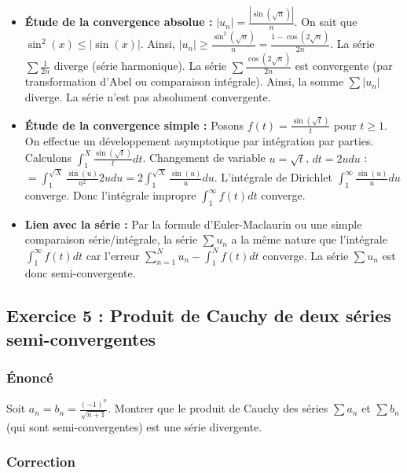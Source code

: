\documentclass[12pt,a4paper]{report}
\begin{document}
\begin{itemize}
\item \textbf{Étude de la convergence absolue :} $|u_n| = \frac{|\sin(\sqrt{n})|}{n}$. On sait que $\sin^2(x) \le |\sin(x)|$. Ainsi, $|u_n| \ge \frac{\sin^2(\sqrt{n})}{n} = \frac{1 - \cos(2\sqrt{n})}{2n}$.
La série $\sum \frac{1}{2n}$ diverge (série harmonique). La série $\sum \frac{\cos(2\sqrt{n})}{2n}$ est convergente (par transformation d'Abel ou comparaison intégrale). Ainsi, la somme $\sum |u_n|$ diverge. La série n'est pas absolument convergente.
\item \textbf{Étude de la convergence simple :} Posons $f(t) = \frac{\sin(\sqrt{t})}{t}$ pour $t \ge 1$.
On effectue un développement asymptotique par intégration par parties. Calculons $\int_1^X \frac{\sin(\sqrt{t})}{t} dt$. Changement de variable $u = \sqrt{t}$, $dt = 2u du$ :
$= \int_1^{\sqrt{X}} \frac{\sin(u)}{u^2} 2u du = 2 \int_1^{\sqrt{X}} \frac{\sin(u)}{u} du$.
L'intégrale de Dirichlet $\int_1^\infty \frac{\sin(u)}{u} du$ converge. Donc l'intégrale impropre $\int_1^\infty f(t) dt$ converge.
\item \textbf{Lien avec la série :} Par la formule d'Euler-Maclaurin ou une simple comparaison série/intégrale, la série $\sum u_n$ a la même nature que l'intégrale $\int_1^\infty f(t) dt$ car l'erreur $\sum_{n=1}^N u_n - \int_1^N f(t) dt$ converge.
La série $\sum u_n$ est donc semi-convergente.
\end{itemize}


\subsection{Exercice 5 : Produit de Cauchy de deux séries semi-convergentes}

\subsubsection{Énoncé}
Soit $a_n = b_n = \frac{(-1)^n}{\sqrt{n+1}}$. Montrer que le produit de Cauchy des séries $\sum a_n$ et $\sum b_n$ (qui sont semi-convergentes) est une série divergente.

\subsubsection{Correction}
\end{document}
